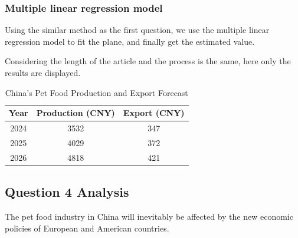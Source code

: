 \documentclass[withoutpreface,bwprint]{cumcmthesis} %
\begin{document}
\subsubsection{Multiple linear regression model}
\par Using the similar method as the first question, we use the multiple linear regression model to fit the plane, and finally get the estimated value.
\par Considering the length of the article and the process is the same, here only the results are displayed.
\begin{table}[htbp]
\centering
\caption{China's Pet Food Production and Export Forecast}
\begin{tabular}{ccc}
\toprule
Year & Production (CNY) & Export (CNY) \\
\midrule
2024 & 3532 & 347 \\
2025 & 4029 & 372 \\
2026 & 4818 & 421 \\
\bottomrule
\end{tabular}
\end{table}
\subsection{Question 4 Analysis}
\par The pet food industry in China will inevitably be affected by the new economic policies of European and American countries.
\end{document}
